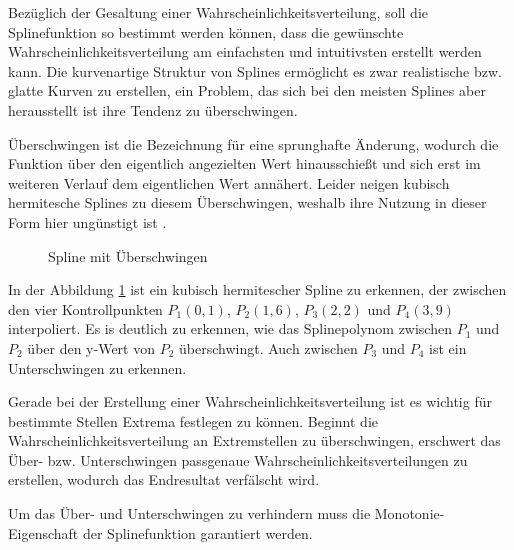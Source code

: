 Bezüglich der Gesaltung einer Wahrscheinlichkeitsverteilung, soll die Splinefunktion so bestimmt werden können, dass die gewünschte Wahrscheinlichkeitsverteilung am einfachsten und intuitivsten erstellt werden kann. Die kurvenartige Struktur von Splines ermöglicht es zwar realistische bzw. glatte Kurven zu erstellen, ein Problem, das sich bei den meisten Splines aber herausstellt ist ihre Tendenz zu überschwingen. 

Überschwingen ist die Bezeichnung für eine sprunghafte Änderung, wodurch die Funktion über den eigentlich angezielten Wert hinausschießt und sich erst im weiteren Verlauf dem eigentlichen Wert annähert. Leider neigen kubisch hermitesche Splines zu diesem Überschwingen, weshalb ihre Nutzung in dieser Form hier ungünstigt ist \cite{kruger:2007}.

\begin{figure}[H]
    \center
    \caption{Spline mit Überschwingen}\label{fig:spline}
\end{figure}

In der Abbildung \ref{fig:spline} ist ein kubisch hermitescher Spline zu erkennen, der zwischen den vier Kontrollpunkten $P_1(0,1)$, $P_2(1,6)$, $P_3(2,2)$ und $P_4(3,9)$ interpoliert. Es is deutlich zu erkennen, wie das Splinepolynom zwischen $P_1$ und $P_2$ über den y-Wert von $P_2$ überschwingt. Auch zwischen $P_3$ und $P_4$ ist ein Unterschwingen zu erkennen.

Gerade bei der Erstellung einer Wahrscheinlichkeitsverteilung ist es wichtig für bestimmte Stellen Extrema festlegen zu können. Beginnt die Wahrscheinlichkeitsverteilung an Extremstellen zu überschwingen, erschwert das Über- bzw. Unterschwingen passgenaue Wahrscheinlichkeitsverteilungen zu erstellen, wodurch das Endresultat verfälscht wird. 

Um das Über- und Unterschwingen zu verhindern muss die Monotonie-Eigenschaft der Splinefunktion garantiert werden.

